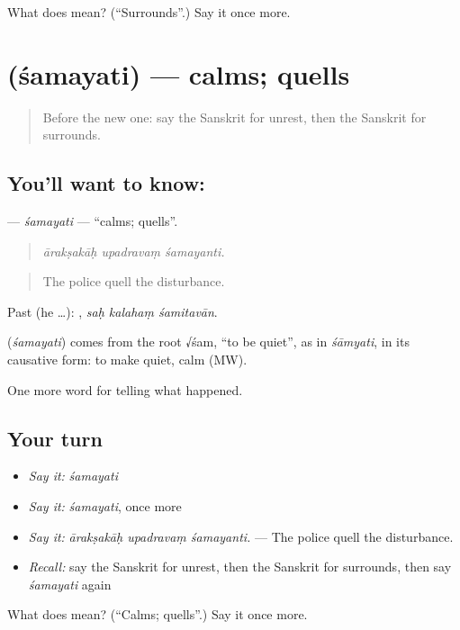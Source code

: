 \begin{tcolorbox}[breakable,colback=teal!4,colframe=teal!35!black,title={Before you move on}]
What does  mean? (\textquotedblleft{}Surrounds\textquotedblright{}.) Say it once more.
\end{tcolorbox}
\section[\texorpdfstring{\sk{शमयति} (śamayati)}{शमयति (śamayati)}]{ (śamayati) — calms; quells}

\label{lesson:SA-C313-samayati}



\begin{quote}
Before the new one: say the Sanskrit for unrest, then the Sanskrit for surrounds.
\end{quote}

\subsection*{You'll want to know: }
\textbf{} — \emph{śamayati} — \textquotedblleft{}calms; quells\textquotedblright{}.

\begin{quote}
  
\end{quote}

\begin{quote}
\emph{ārakṣakāḥ upadravaṃ śamayanti.}
\end{quote}

\begin{quote}
The police quell the disturbance.
\end{quote}

Past (he …):   , \emph{saḥ kalahaṃ śamitavān}.

\begin{cousinweb}
\textbf{} (\emph{śamayati}) comes from the root √śam, \textquotedblleft{}to be quiet\textquotedblright{}, as in \emph{śāmyati}, in its causative form: to make quiet, calm (MW).
\end{cousinweb}

\begin{grammarlens}[title={What you've built}]
One more word for telling what happened.
\end{grammarlens}

\subsection*{Your turn}
\begin{itemize}
\raggedright
  \item \emph{Say it:} \emph{śamayati}
  \item \emph{Say it:} \emph{śamayati}, once more
  \item \emph{Say it:} \emph{ārakṣakāḥ upadravaṃ śamayanti.} — The police quell the disturbance.
  \item \emph{Recall:} say the Sanskrit for unrest, then the Sanskrit for surrounds, then say \emph{śamayati} again
\end{itemize}

\begin{tcolorbox}[breakable,colback=teal!4,colframe=teal!35!black,title={Before you move on}]
What does  mean? (\textquotedblleft{}Calms; quells\textquotedblright{}.) Say it once more.
\end{tcolorbox}
